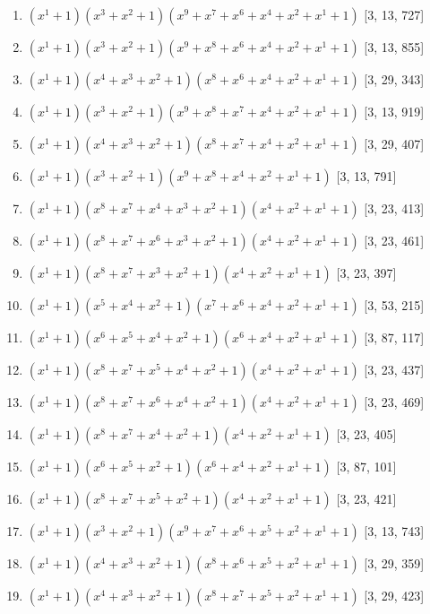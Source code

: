 \documentclass[10pt,twocolumn]{article}
\begin{document}
\begin{enumerate}
\item $(x^{1} + 1)(x^{3} + x^{2} + 1)(x^{9} + x^{7} + x^{6} + x^{4} + x^{2} + x^{1} + 1)$  [3, 13, 727]
\item $(x^{1} + 1)(x^{3} + x^{2} + 1)(x^{9} + x^{8} + x^{6} + x^{4} + x^{2} + x^{1} + 1)$  [3, 13, 855]
\item $(x^{1} + 1)(x^{4} + x^{3} + x^{2} + 1)(x^{8} + x^{6} + x^{4} + x^{2} + x^{1} + 1)$  [3, 29, 343]
\item $(x^{1} + 1)(x^{3} + x^{2} + 1)(x^{9} + x^{8} + x^{7} + x^{4} + x^{2} + x^{1} + 1)$  [3, 13, 919]
\item $(x^{1} + 1)(x^{4} + x^{3} + x^{2} + 1)(x^{8} + x^{7} + x^{4} + x^{2} + x^{1} + 1)$  [3, 29, 407]
\item $(x^{1} + 1)(x^{3} + x^{2} + 1)(x^{9} + x^{8} + x^{4} + x^{2} + x^{1} + 1)$  [3, 13, 791]
\item $(x^{1} + 1)(x^{8} + x^{7} + x^{4} + x^{3} + x^{2} + 1)(x^{4} + x^{2} + x^{1} + 1)$  [3, 23, 413]
\item $(x^{1} + 1)(x^{8} + x^{7} + x^{6} + x^{3} + x^{2} + 1)(x^{4} + x^{2} + x^{1} + 1)$  [3, 23, 461]
\item $(x^{1} + 1)(x^{8} + x^{7} + x^{3} + x^{2} + 1)(x^{4} + x^{2} + x^{1} + 1)$  [3, 23, 397]
\item $(x^{1} + 1)(x^{5} + x^{4} + x^{2} + 1)(x^{7} + x^{6} + x^{4} + x^{2} + x^{1} + 1)$  [3, 53, 215]
\item $(x^{1} + 1)(x^{6} + x^{5} + x^{4} + x^{2} + 1)(x^{6} + x^{4} + x^{2} + x^{1} + 1)$  [3, 87, 117]
\item $(x^{1} + 1)(x^{8} + x^{7} + x^{5} + x^{4} + x^{2} + 1)(x^{4} + x^{2} + x^{1} + 1)$  [3, 23, 437]
\item $(x^{1} + 1)(x^{8} + x^{7} + x^{6} + x^{4} + x^{2} + 1)(x^{4} + x^{2} + x^{1} + 1)$  [3, 23, 469]
\item $(x^{1} + 1)(x^{8} + x^{7} + x^{4} + x^{2} + 1)(x^{4} + x^{2} + x^{1} + 1)$  [3, 23, 405]
\item $(x^{1} + 1)(x^{6} + x^{5} + x^{2} + 1)(x^{6} + x^{4} + x^{2} + x^{1} + 1)$  [3, 87, 101]
\item $(x^{1} + 1)(x^{8} + x^{7} + x^{5} + x^{2} + 1)(x^{4} + x^{2} + x^{1} + 1)$  [3, 23, 421]
\item $(x^{1} + 1)(x^{3} + x^{2} + 1)(x^{9} + x^{7} + x^{6} + x^{5} + x^{2} + x^{1} + 1)$  [3, 13, 743]
\item $(x^{1} + 1)(x^{4} + x^{3} + x^{2} + 1)(x^{8} + x^{6} + x^{5} + x^{2} + x^{1} + 1)$  [3, 29, 359]
\item $(x^{1} + 1)(x^{4} + x^{3} + x^{2} + 1)(x^{8} + x^{7} + x^{5} + x^{2} + x^{1} + 1)$  [3, 29, 423]

\end{enumerate}
\end{document}
